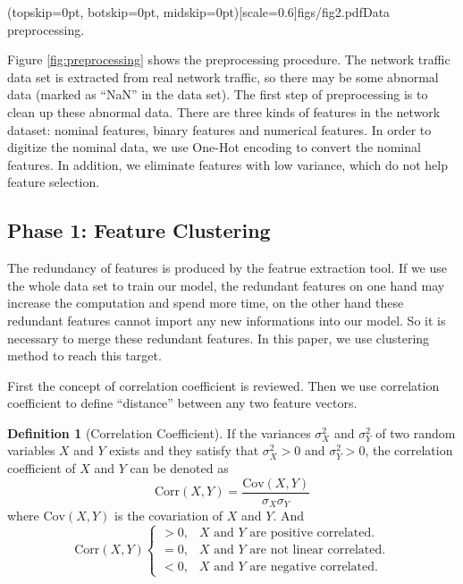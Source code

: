 \documentclass{ieeeaccess}
\theoremstyle{definition}
\newtheorem{defn}{Definition}
\begin{document}
\Figure[!htpb](topskip=0pt, botskip=0pt, midskip=0pt)[scale=0.6]{figs/fig2.pdf}{Data preprocessing. \label{fig:preprocessing}}

Figure \ref{fig:preprocessing} shows the preprocessing procedure. The network traffic data set is extracted from real network traffic, so there may be some abnormal data (marked as ``NaN'' in the data set). The first step of preprocessing is to clean up these abnormal data. There are three kinds of features in the network dataset: nominal features, binary features and numerical features. In order to digitize the nominal data, we use One-Hot encoding to convert the nominal features. In addition, we eliminate features with low variance, which do not help feature selection.

\subsection{Phase 1: Feature Clustering}

The redundancy of features is produced by the featrue extraction tool. If we use the whole data set to train our model, the redundant features on one hand may increase the computation and spend more time, on the other hand these redundant features cannot import any new informations into our model. So it is necessary to merge these redundant features. In this paper, we use clustering method to reach this target.

First the concept of correlation coefficient is reviewed. Then we use correlation coefficient to define ``distance'' between any two feature vectors. 

\begin{defn}[Correlation Coefficient]
    If the variances $\sigma^2_X$ and $\sigma_Y^2$ of two random variables $X$ and $Y$ exists and they satisfy that $\sigma^2_X > 0$ and $\sigma^2_Y > 0$, the correlation coefficient of $X$ and $Y$ can be denoted as
    \begin{equation}
        \text{Corr}(X, Y) = \frac{\text{Cov}(X, Y)}{\sigma_X \sigma_Y}
    \end{equation}
    where $\text{Cov}(X, Y)$ is the covariation of $X$ and $Y$. And
    $$\text{Corr}(X, Y) 
    \begin{cases}
    > 0, & X \text{ and } Y \text{ are positive correlated.}\\
    = 0, & X \text{ and } Y \text{ are not linear correlated.} \\
    < 0, & X \text{ and } Y \text{ are negative correlated.}
    \end{cases}$$
\end{defn}
\end{document}
